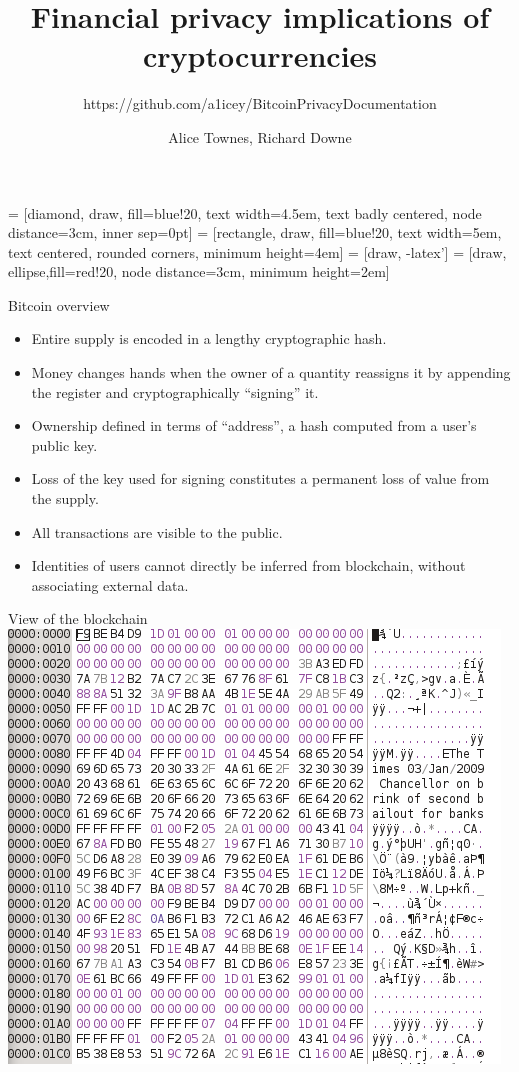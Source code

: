 \documentclass{beamer}
\title{Financial privacy implications of cryptocurrencies}
\subtitle{https://github.com/a1icey/BitcoinPrivacyDocumentation}
\author{Alice Townes, Richard Downe}
\begin{document}
 = [diamond, draw, fill=blue!20, 
    text width=4.5em, text badly centered, node distance=3cm, inner sep=0pt]
 = [rectangle, draw, fill=blue!20, 
    text width=5em, text centered, rounded corners, minimum height=4em]
 = [draw, -latex']
 = [draw, ellipse,fill=red!20, node distance=3cm,
    minimum height=2em]
    
\begin{frame}
 \titlepage
\end{frame}

\begin{frame}
 Bitcoin overview
 \begin{itemize}
  \item Entire supply is encoded in a lengthy cryptographic hash.
  \item Money changes hands when the owner of a quantity reassigns it by appending the register and cryptographically ``signing'' it.
  \item Ownership defined in terms of ``address'', a hash computed from a user's public key.
  \item Loss of the key used for signing constitutes a permanent loss of value from the supply.
  \item All transactions are visible to the public.
  \item Identities of users cannot directly be inferred from blockchain, without associating external data.
 \end{itemize}
\end{frame}
 
\begin{frame}
  View of the blockchain\\
  \vspace{1em}
  \includegraphics[height=0.7\textheight]{blockchain}
\end{frame}
\end{document}
